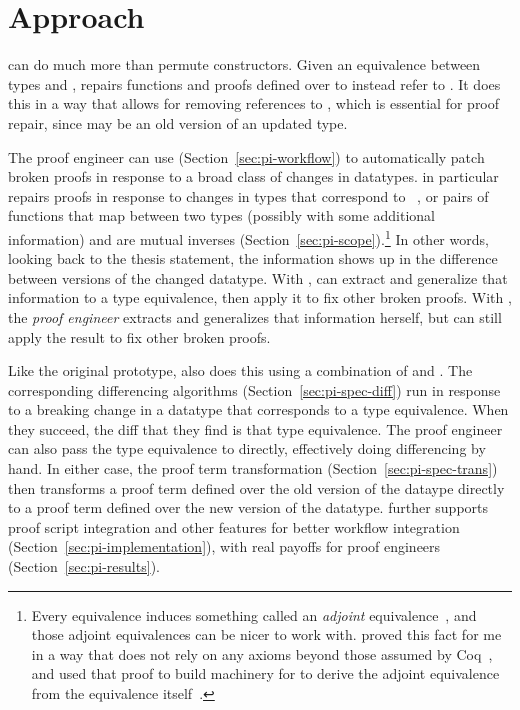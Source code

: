 \section{Approach}
\label{sec:pi-approach}


\toolnamec can do much more than permute constructors.
Given an equivalence between types \Aa and \B,
\toolnamec repairs functions and proofs defined over \Aa to instead refer to \B.
It does this in a way that allows for removing references to \Aa, which is essential for proof repair,
since \Aa may be an old version of an updated type.

The proof engineer can use \toolnamec (Section~\ref{sec:pi-workflow}) to automatically patch broken proofs in response to a broad class of changes in datatypes.
\toolnamec in particular repairs proofs in response to changes in types that correspond to ~\cite{univalent2013homotopy},
or pairs of functions that map between two types (possibly with some additional information) and are mutual 
inverses (Section~\ref{sec:pi-scope}).\footnote{Every equivalence induces something called an \textit{adjoint} equivalence~\cite{univalent2013homotopy},
and those adjoint equivalences can be nicer to work with.
 proved this fact for me in a way that does not rely on any axioms beyond those assumed by Coq~\href{https://github.com/uwplse/pumpkin-pi/blob/v2.0.0/plugin/theories/Adjoint.v}{},
and  used that proof to build machinery for \toolnamec to derive the adjoint equivalence from the equivalence itself~\href{https://github.com/uwplse/pumpkin-pi/blob/v2.0.0/plugin/src/automation/search/equivalence.ml}{}.}
In other words, looking back to the thesis statement, the information shows up in the difference between versions of the changed datatype.
With , \toolnamec can extract and generalize that information to a type equivalence, then apply it to fix other broken proofs.
With , the \textit{proof engineer} extracts and generalizes that information herself, but \toolnamec can still apply the result
to fix other broken proofs.

Like the original  prototype, \toolnamec also does this using a combination of  and .
The corresponding differencing algorithms (Section~\ref{sec:pi-spec-diff}) run in response to a breaking change in a datatype that corresponds to a type equivalence.
When they succeed, the diff that they find is that type equivalence.
The proof engineer can also pass the type equivalence to \toolnamec directly, effectively doing differencing by hand.
In either case, the proof term transformation (Section~\ref{sec:pi-spec-trans}) then transforms a proof term defined over the old version of the dataype
directly to a proof term defined over the new version of the datatype.
\toolnamec further supports proof script integration and other features for better workflow integration (Section~\ref{sec:pi-implementation}),
with real payoffs for proof engineers (Section~\ref{sec:pi-results}).

